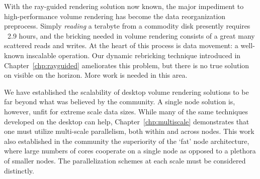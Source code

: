 With the ray-guided rendering solution now known, the major impediment
to high-performance volume rendering has become the data reorganization
preprocess.  Simply \emph{reading} a terabyte from a commodity disk
presently requires ~2.9 hours, and the bricking needed in volume
rendering consists of a great many scattered reads and writes.  At
the heart of this process is data movement: a well-known inscalable
operation.  Our dynamic rebricking technique introduced in
Chapter~\ref{chp:rayguided} ameliorates this problem, but there is no
true solution on visible on the horizon.  More work is needed in this
area.


We have established the scalability of desktop volume rendering
solutions to be far beyond what was believed by the community.  A
single node solution is, however, unfit for extreme scale data sizes.
While many of the same techniques developed on the desktop can help,
Chapter~\ref{chp:multiscale} demonstrates that one must utilize
multi-scale parallelism, both within and across nodes.  This work
also established in the community the superiority of the `fat' node
architecture, where large numbers of cores cooperate on a single node
as opposed to a plethora of smaller nodes.  The parallelization schemes
at each scale must be considered distinctly.


